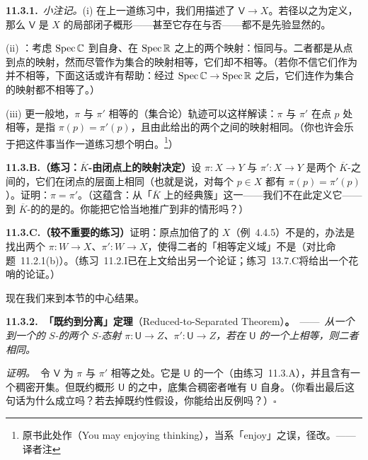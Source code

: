 \textbf{11.3.1.}\ \emph{小注记。}\quad (i) 在上一道练习中，我们用\trUniversalProperty{}描述了 $\mathsf{V}\to X$。若径以之为定义，那么 $\mathsf{V}$ 是 $X$ 的局部闭子概形——甚至它存在与否——都不是先验显然的。

(ii) \trhWarning{}：考虑 $\operatorname{Spec}\mathbb{C}$ 到自身、在 $\operatorname{Spec}\mathbb{R}$ 之上的两个映射：恒同与\trComplex\trConjugate。二者都是从点到点的映射，然而尽管作为集合的映射相等，它们却不相等。（若你不信它们作为\trMorphism{}并不相等，下面这话或许有帮助：经过\trBaseChange{} $\operatorname{Spec}\mathbb{C}\to\operatorname{Spec}\mathbb{R}$ 之后，它们连作为集合的映射都不相等了。）

(iii) 更一般地，$\pi$ 与 $\pi'$ 相等的（集合论）轨迹可以这样解读：$\pi$ 与 $\pi'$ 在点 $p$ 处相等，是指 $\pi(p)=\pi'(p)$，且由此给出的两个\trResidueField{}之间的映射相同。（你也许会乐于把这件事当作一道练习想个明白。\footnote{原书此处作（You may enjoying thinking），当系「enjoy」之误，径改。——译者注}）

\textbf{11.3.B.（练习：$\overline{K}$-\trVariety{}由闭点上的映射决定）}\quad 设 $\pi\colon X\to Y$ 与 $\pi'\colon X\to Y$ 是两个 $\overline{K}$-\trVariety{}之间的\trMorphism，它们在闭点的层面上相同（也就是说，对每个\trClosedPoint{} $p\in X$ 都有 $\pi(p)=\pi'(p)$）。证明：$\pi=\pi'$。（这蕴含：从「$\overline{K}$ 上的经典簇」这一\trCategory——我们不在此定义它——到 $\overline{K}$-\trScheme{}的\trCategory{}的\trFunctor{}是\trFullyFaithful{}的。你能把它恰当地推广到非\trAlgClosedField{}的情形吗？）

\textbf{11.3.C.（较不重要的练习）}\quad 证明：原点加倍了的\trAffineLine{} $X$（例~4.4.5）不是\trSeparated{}的，办法是找出两个\trMorphism{} $\pi\colon W\to X$、$\pi'\colon W\to X$，使得二者的「相等定义域」不是\trClosedSubscheme（对比\mbox{命题~11.2.1(b)}）。（\mbox{练习~11.2.I}已在上文给出另一个论证；\mbox{练习~13.7.C}将给出一个花哨的论证。）

现在我们来到本节的中心结果。

\textbf{11.3.2.\ 「既约到分离」定理}（Reduced-to-Separated Theorem）\textbf{。}\ ——\ \emph{从一个\trReduced\trScheme{}到一个\trSeparated{}的 $S$-\trScheme{}的两个 $S$-态射 $\pi\colon\mathsf{U}\to Z$、$\pi'\colon\mathsf{U}\to Z$，若在 $\mathsf{U}$ 的一个\trDense\trOpenSubset{}上相等，则二者相同。}

\emph{证明。}\ 令 $\mathsf{V}$ 为 $\pi$ 与 $\pi'$ 相等之处。它是 $\mathsf{U}$ 的一个\trClosedSubscheme（由\mbox{练习~11.3.A}），并且含有一个稠密开集。但既约概形 $\mathsf{U}$ 的\trClosedSubscheme{}之中，底集合稠密者唯有 $\mathsf{U}$ 自身。（你看出最后这句话为什么成立吗？若去掉既约性假设，你能给出反例吗？）\hfill$\square$

